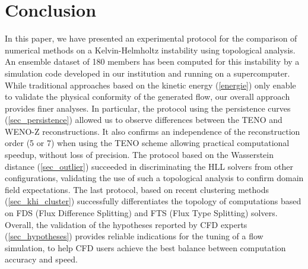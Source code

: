 
\section{Conclusion}
In this paper, we have presented an experimental protocol for the comparison of
numerical methods on a Kelvin-Helmholtz instability using topological analysis.
An ensemble dataset of 180 members has been computed for this instability by a
simulation code developed in our institution and running on a supercomputer.
While traditional approaches based on the kinetic energy (\autoref{energie}) only enable
to validate the physical conformity of the generated flow,
our overall approach provides finer analyses. In particular,
the
protocol using the persistence curves (\autoref{sec_persistence}) allowed us to
observe differences between the TENO and WENO-Z reconstructions. It also
confirms an independence of the
reconstruction order (5 or 7) when
using the TENO scheme allowing
practical
computational speedup,
without loss of precision. The protocol
based on the Wasserstein distance (\autoref{sec_outlier}) succeeded in
discriminating the HLL solvers from other configurations, validating the use of
such a topological analysis to confirm domain field expectations. The last
protocol, based on recent clustering methods (\autoref{sec_khi_cluster})
successfully differentiates the topology of computations based on FDS (Flux
Difference Splitting) and FTS (Flux Type Splitting) solvers.
Overall, the validation of the hypotheses reported by CFD experts (\autoref{sec_hypotheses}) provides reliable indications for the tuning of a flow simulation, to help CFD users achieve the best balance between computation accuracy and speed.
%
%


